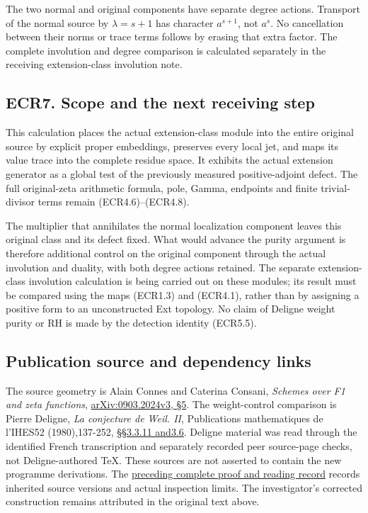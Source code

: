 The two normal and original components have separate degree actions.
Transport of the normal source by \(\lambda=s+1\) has character
\(a^{s+1}\), not \(a^s\). No cancellation between their norms or trace
terms follows by erasing that extra factor. The complete involution and
degree comparison is calculated separately in the receiving
extension-class involution note.

\subsection{ECR7. Scope and the next receiving
step}\label{ecr7.-scope-and-the-next-receiving-step}

This calculation places the actual extension-class module into the
entire original source by explicit proper embeddings, preserves every
local jet, and maps its value trace into the complete residue space. It
exhibits the actual extension generator as a global test of the
previously measured positive-adjoint defect. The full original-zeta
arithmetic formula, pole, Gamma, endpoints and finite trivial-divisor
terms remain (ECR4.6)--(ECR4.8).

The multiplier that annihilates the normal localization component leaves
this original class and its defect fixed. What would advance the purity
argument is therefore additional control on the original component
through the actual involution and duality, with both degree actions
retained. The separate extension-class involution calculation is being
carried out on these modules; its result must be compared using the maps
(ECR1.3) and (ECR4.1), rather than by assigning a positive form to an
unconstructed Ext topology. No claim of Deligne weight purity or RH is
made by the detection identity (ECR5.5).

\subsection{Publication source and dependency
links}\label{publication-source-and-dependency-links}

The source geometry is Alain Connes and Caterina Consani, \emph{Schemes
over F1 and zeta functions},
\href{https://arxiv.org/abs/0903.2024v3}{arXiv:0903.2024v3, §5}. The
weight-control comparison is Pierre Deligne, \emph{La conjecture de
Weil. II}, Publications mathematiques de l'IHES52 (1980),137-252,
\href{https://www.numdam.org/item/PMIHES_1980__52__137_0/}{§§3.3.11
and3.6}. Deligne material was read through the identified French
transcription and separately recorded peer source-page checks, not
Deligne-authored TeX. These sources are not asserted to contain the new
programme derivations. The
\href{https://github.com/KokunoYumeto/zeta-function-research-reader/blob/36a82ecca98addb8a98b48204e349737856c7223/workbenches/splitzero-tandem/continuations/20260924-cohomology-weight-and-character-lifts/BUILD_AND_REVIEW.md}{preceding
complete proof and reading record} records inherited source versions and
actual inspection limits. The investigator's corrected construction
remains attributed in the original text above.
